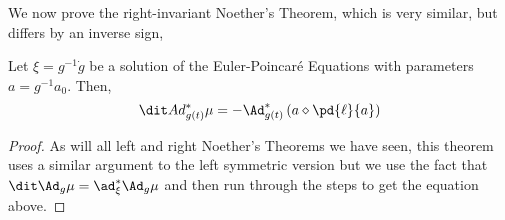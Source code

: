 \noindent
We now prove the right-invariant Noether's Theorem, which is very similar, but differs by an inverse sign,
\begin{nthm}
  Let $\xi = g^{-1}\dot g$ be a solution of the Euler-Poincar\'e Equations with parameters $a = g^{-1}a_0$. Then,
  $$ \dit Ad^*_{g(t)} \mu = -\Ad^*_{g(t)} \left(a \diamond \pd{\ell}{a}\right) $$
\end{nthm}
\begin{proof}
  As will all left and right Noether's Theorems we have seen, this theorem uses a similar argument to the left symmetric version but we use the fact that $\dit \Ad_g \mu = \ad^*_\xi \Ad_g \mu$ and then run through the steps to get the equation above.
\end{proof}

